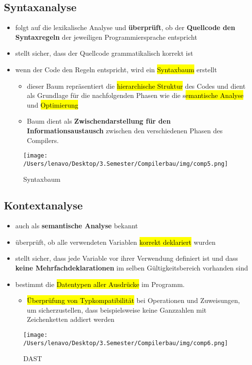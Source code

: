 \documentclass[a4paper, 10pt]{article}
\begin{document}
\subsection{Syntaxanalyse}
\begin{itemize}
    \item folgt auf die lexikalische Analyse und \textbf{überprüft}, ob der \textbf{Quellcode den Syntaxregeln} der jeweiligen Programmiersprache entspricht
    \item stellt sicher, dass der Quellcode grammatikalisch korrekt ist
    \item wenn der Code den Regeln entspricht, wird ein \hl{Syntaxbaum} erstellt
    \begin{itemize}
        \item dieser Baum repräsentiert die \hl{hierarchische Struktur} des Codes und dient als Grundlage für die nachfolgenden Phasen wie die s\hl{emantische Analyse} und \hl{Optimierung}
        \item Baum dient als \textbf{Zwischendarstellung für den Informationsaustausch} zwischen den verschiedenen Phasen des Compilers.
    \end{itemize}
\end{itemize}
\begin{figure}[h]
    \centering
    \texttt{[image: /Users/lenavo/Desktop/3.Semester/Compilerbau/img/comp5.png]}
    \caption{Syntaxbaum}
    \label{fig:enter-label}
\end{figure}

\subsection{Kontextanalyse}
\begin{itemize}
    \item auch als \textbf{semantische Analyse} bekannt
    \item überprüft, ob alle verwendeten Variablen \hl{korrekt deklariert} wurden
    \item stellt sicher, dass jede Variable vor ihrer Verwendung definiert ist und dass \textbf{keine Mehrfachdeklarationen} im selben Gültigkeitsbereich vorhanden sind
    \item bestimmt die \hl{Datentypen aller Ausdrücke} im Programm.
    \begin{itemize}
        \item \hl{Überprüfung von Typkompatibilität} bei Operationen und Zuweisungen, um sicherzustellen, dass beispielsweise keine Ganzzahlen mit Zeichenketten addiert werden
    \end{itemize}
\end{itemize}
\begin{figure}[h]
    \centering
    \texttt{[image: /Users/lenavo/Desktop/3.Semester/Compilerbau/img/comp6.png]}
    \caption{DAST}
    \label{fig:enter-label}
\end{figure}
\end{document}

